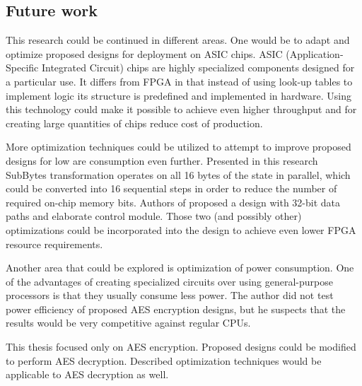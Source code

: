 \subsection{Future work}
\label{sec:future-work}
This research could be continued in different areas. One would be to adapt and optimize proposed designs for deployment on ASIC chips. ASIC (Application-Specific Integrated Circuit) chips are highly specialized components designed for a particular use. It differs from FPGA in that instead of using look-up tables to implement logic its structure is predefined and implemented in hardware. Using this technology could make it possible to achieve even higher throughput and for creating large quantities of chips reduce cost of production.

More optimization techniques could be utilized to attempt to improve proposed designs for low are consumption even further. Presented in this research SubBytes transformation operates on all 16 bytes of the state in parallel, which could be converted into 16 sequential steps in order to reduce the number of required on-chip memory bits. Authors of \cite{good2005aes} proposed a design with 32-bit data paths and elaborate control module. Those two (and possibly other) optimizations could be incorporated into the design to achieve even lower FPGA resource requirements.

Another area that could be explored is optimization of power consumption. One of the advantages of creating specialized circuits over using general-purpose processors is that they usually consume less power. The author did not test power efficiency of proposed AES encryption designs, but he suspects that the results would be very competitive against regular CPUs.

This thesis focused only on AES encryption. Proposed designs could be modified to perform AES decryption. Described optimization techniques would be applicable to AES decryption as well.
